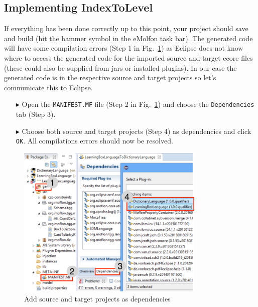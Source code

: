 \hypertarget{subsec:IndexToLevel}{}
\subsection{Implementing IndexToLevel}
\genHeader

If everything has been done correctly up to this point, your project should save and build (hit the hammer symbol in the eMolfon task bar).
The generated code will have some compilation errors (Step 1 in Fig.~\ref{eclipse:tggGenerated}) as Eclipse does not know where to access the generated code for the imported source and target ecore files (these could also be supplied from jars or installed plugins).
In our case the generated code is in the respective source and target projects so let's communicate this to Eclipse.

\begin{enumerate}

\item[$\blacktriangleright$] Open the \texttt{MANIFEST.MF} file (Step 2 in Fig.~\ref{eclipse:tggGenerated}) and choose the \texttt{De\-pen\-den\-cies} tab (Step 3).

\item[$\blacktriangleright$] Choose both source and target projects (Step 4) as dependencies and click \texttt{OK}.
All compilations errors should now be resolved.
\end{enumerate}

\begin{figure}[htb]
\begin{center}
  \includegraphics[width=0.8\textwidth]{eclipse_generatedTGG}
  \caption{Add source and target projects as dependencies}
  \label{eclipse:tggGenerated}
\end{center}
\end{figure}


